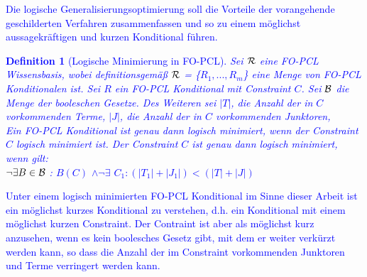 \documentclass[a4paper, 11pt]{book}
\newtheorem{Def}{Definition }[section]
\begin{document}
\textcolor{blue}{
	Die logische Generalisierungsoptimierung soll die Vorteile der vorangehende geschilderten Verfahren zusammenfassen und so zu einem möglichst aussagekräftigen und kurzen Konditional führen.
\begin{Def}[Logische Minimierung in FO-PCL] \label{Logische Min} 
	Sei $\cal{R}$ eine FO-PCL Wissensbasis, wobei definitionsgemäß $\cal{R}$  = \{$ R_1, ..., R_m $\} eine Menge von FO-PCL Konditionalen ist. Sei $ R $ ein FO-PCL Konditional mit Constraint $ C $. Sei $ \cal B $ die Menge der booleschen Gesetze. Des Weiteren sei $ |T| $, die Anzahl der in $ C $ vorkommenden Terme, $ |J| $, die Anzahl der in $ C $ vorkommenden Junktoren,  \\
	Ein FO-PCL Konditional ist genau dann logisch minimiert, wenn der Constraint $ C $ logisch minimiert ist. Der Constraint $ C $ ist genau dann logisch minimiert, wenn gilt:\\
	$ \neg \exists B \in \cal{B} $ : $ B(C)$  $\land  \neg \exists$   $ C_1 : ( |T_1| + |J_1|) < ( |T| + |J|) $\\
\end{Def}
Unter einem logisch minimierten FO-PCL Konditional im Sinne dieser Arbeit ist ein möglichst kurzes Konditional zu verstehen, d.h. ein Konditional mit einem möglichst kurzen Constraint. Der Contraint ist aber als möglichst kurz anzusehen, wenn es kein boolesches Gesetz gibt, mit dem er weiter verkürzt werden kann, so dass die Anzahl der im Constraint vorkommenden Junktoren und Terme verringert werden kann. 
}
\end{document}
